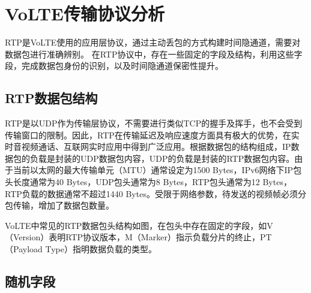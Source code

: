 \section{VoLTE传输协议分析}
\label{chap:backinfo:rtp}

RTP是VoLTE使用的应用层协议，通过主动丢包的方式构建时间隐通道，需要对数据包进行准确辨别。
在RTP协议中，存在一些固定的字段及结构，利用这些字段，完成数据包身份的识别，以及时间隐通道保密性提升。

\subsection{RTP数据包结构}
\label{chap:backinfo:rtp:struct}

RTP是以UDP作为传输层协议，不需要进行类似TCP的握手及挥手，也不会受到传输窗口的限制。因此，RTP在传输延迟及响应速度方面具有极大的优势，在实时音视频通话、互联网实时应用中得到广泛应用。根据数据包的结构组成，IP数据包的负载是封装的UDP数据包内容，UDP的负载是封装的RTP数据包内容。由于当前以太网的最大传输单元（MTU）通常设定为1500 Bytes，IPv6网络下IP包头长度通常为40 Bytes，UDP包头通常为8 Bytes，RTP包头通常为12 Bytes，RTP负载的数据通常不超过1440 Bytes。受限于网络参数，待发送的视频帧必须分包传输，增加了数据包数量。


VoLTE中常见的RTP数据包头结构如图，在包头中存在固定的字段，如V（Version）表明RTP协议版本，M（Marker）指示负载分片的终止，PT（Payload Type）指明数据负载的类型。

\subsection{随机字段}
\label{chap:backinfo:random}

